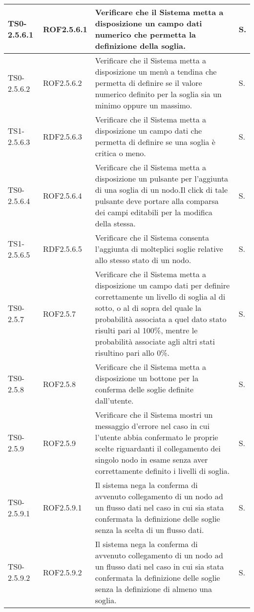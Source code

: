 \begin{longtable}{|C{.15\textwidth}|C{.14\textwidth}|m{.52\textwidth}|m{.08\textwidth}|}
\hline
{}TS0-2.5.6.1 & ROF2.5.6.1 & Verificare che il Sistema metta a disposizione un campo dati numerico che permetta la definizione della soglia. & S. \\ 
\hline
TS0-2.5.6.2 & ROF2.5.6.2 & Verificare che il Sistema metta a disposizione un menù a tendina che permetta di definire se il valore numerico definito per la soglia sia un minimo oppure un massimo. & S. \\
\hline
{}TS1-2.5.6.3 & RDF2.5.6.3  & Verificare che il Sistema metta a disposizione un campo dati che permetta di definire se una soglia è critica o meno.  & S. \\
\hline
TS0-2.5.6.4 & ROF2.5.6.4  & Verificare che il Sistema metta a disposizione un pulsante per l'aggiunta di una soglia di un nodo.Il click di tale pulsante deve portare alla comparsa dei campi editabili per la modifica della stessa. & S. \\
\hline
{}TS1-2.5.6.5 & RDF2.5.6.5  & Verificare che il Sistema consenta l'aggiunta di molteplici soglie relative allo stesso stato di un nodo. & S. \\
\hline
TS0-2.5.7 & ROF2.5.7 & Verificare che il Sistema metta a disposizione un campo dati per definire correttamente un livello di soglia al di sotto, o al di sopra del quale la probabilità associata a quel dato stato risulti pari al 100\%, mentre le probabilità associate agli altri stati risultino pari allo 0\%. & S. \\
\hline
{}TS0-2.5.8 & ROF2.5.8 & Verificare che il Sistema metta a disposizione un bottone per la conferma delle soglie definite dall'utente. & S. \\
\hline
TS0-2.5.9 & ROF2.5.9 & Verificare che il Sistema mostri un messaggio d'errore nel caso in cui l'utente abbia confermato le proprie scelte riguardanti il collegamento dei singolo nodo in esame senza aver correttamente definito i livelli di soglia. & S. \\
\hline
{}TS0-2.5.9.1 & ROF2.5.9.1 & Il sistema nega la conferma di avvenuto collegamento di un nodo ad un flusso dati nel caso in cui sia stata confermata la definizione delle soglie senza la scelta di un flusso dati. & S. \\
\hline
TS0-2.5.9.2 & ROF2.5.9.2  & Il sistema nega la conferma di avvenuto collegamento di un nodo ad un flusso dati nel caso in cui sia stata confermata la definizione delle soglie senza la definizione di almeno una soglia. & S. \\
\hline

\end{longtable}
